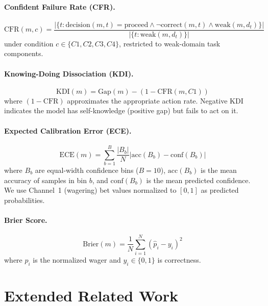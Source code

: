 \documentclass[10pt]{article}
\newcommand{\KDI}{KDI}
\newcommand{\CFR}{CFR}
\begin{document}
\paragraph{Confident Failure Rate (\CFR{}).}
\begin{equation}
\text{CFR}(m, c) = \frac{|\{t : \text{decision}(m,t) = \text{proceed} \wedge \neg\text{correct}(m,t) \wedge \text{weak}(m,d_t)\}|}{|\{t : \text{weak}(m, d_t)\}|}
\label{eq:cfr}
\end{equation}
under condition $c \in \{C1, C2, C3, C4\}$, restricted to weak-domain task components.

\paragraph{Knowing-Doing Dissociation (\KDI{}).}
\begin{equation}
\text{KDI}(m) = \text{Gap}(m) - (1 - \text{CFR}(m, C1))
\label{eq:kdi}
\end{equation}
where $(1 - \text{CFR})$ approximates the appropriate action rate. Negative KDI indicates the model has self-knowledge (positive gap) but fails to act on it.

\paragraph{Expected Calibration Error (ECE).}
\begin{equation}
\text{ECE}(m) = \sum_{b=1}^{B} \frac{|B_b|}{N} \left| \text{acc}(B_b) - \text{conf}(B_b) \right|
\end{equation}
where $B_b$ are equal-width confidence bins ($B\!=\!10$), $\text{acc}(B_b)$ is the mean accuracy of samples in bin $b$, and $\text{conf}(B_b)$ is the mean predicted confidence. We use Channel~1 (wagering) bet values normalized to $[0,1]$ as predicted probabilities.

\paragraph{Brier Score.}
\begin{equation}
\text{Brier}(m) = \frac{1}{N} \sum_{i=1}^{N} (\hat{p}_i - y_i)^2
\end{equation}
where $\hat{p}_i$ is the normalized wager and $y_i \in \{0,1\}$ is correctness.

\section{Extended Related Work}
\label{app:extended-related}
\end{document}
